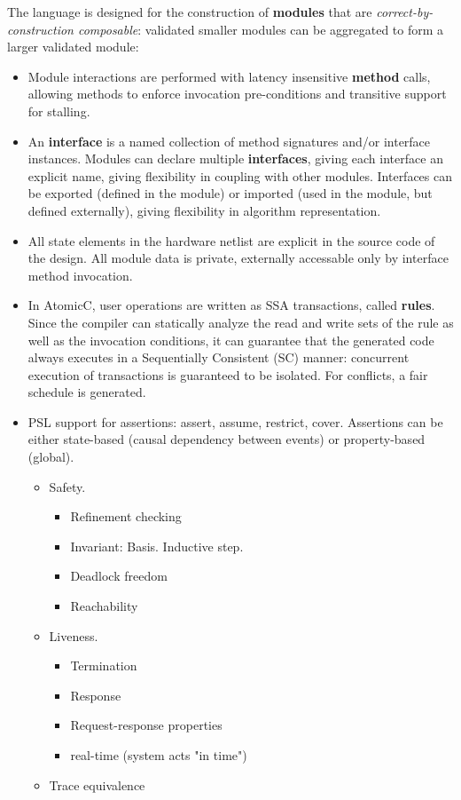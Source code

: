 The language is designed for
the construction of \textbf{modules} that are \textit{correct-by-construction composable}:
validated smaller modules can be aggregated to form
a larger validated module:
\begin{itemize}

\item Module interactions are performed with
latency insensitive
\textbf{method} calls, allowing methods to enforce invocation pre-conditions
and transitive support for stalling.

\item An \textbf{interface} is a named collection of method signatures and/or interface instances.
Modules can declare
multiple \textbf{interfaces}, giving each interface an explicit name,
giving flexibility in coupling with other modules.
Interfaces can be exported (defined in the module) or imported (used in
the module, but defined externally), giving flexibility in algorithm
representation.

\item All state elements in the hardware
netlist are explicit in the source code of the design.
All module data is private, externally accessable only by interface method invocation.

\item In AtomicC, user operations are written as SSA transactions, called \textbf{rules}.  Since the
compiler can statically analyze the read and write sets of the rule as well as the
invocation conditions, it can guarantee that the generated code always executes
in a Sequentially Consistent (SC) manner: concurrent execution of transactions is
guaranteed to be isolated.  For conflicts, a fair schedule is generated.

\item PSL \cite{PSL} support for assertions: assert, assume, restrict, cover.
Assertions can be either state-based (causal dependency between events) or
property-based (global).
\begin{itemize}
\item Safety.
\begin{itemize}
\setlength\itemsep{-0.5em}
\item Refinement checking
\item Invariant:  Basis.  Inductive step.
\item Deadlock freedom
\item Reachability
\end{itemize}
\item Liveness.
\begin{itemize}
\setlength\itemsep{-0.5em}
\item Termination
\item Response
\item Request-response properties
\item real-time (system acts "in time")
\end{itemize}
\item Trace equivalence
\end{itemize}


\end{itemize}

